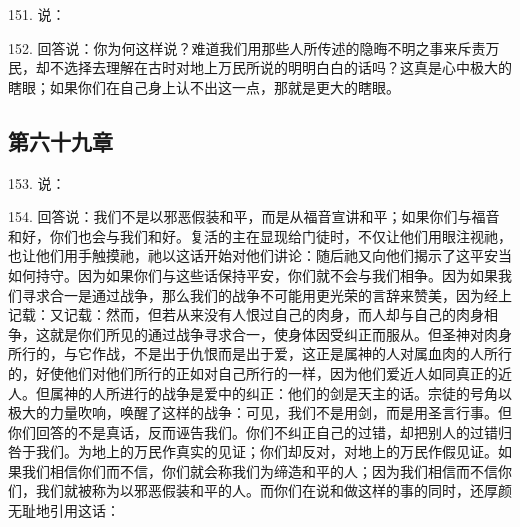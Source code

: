 151. 说：\par

152. 回答说：你为何这样说？难道我们用那些人所传述的隐晦不明之事来斥责万民，却不选择去理解在古时对地上万民所说的明明白白的话吗？这真是心中极大的瞎眼；如果你们在自己身上认不出这一点，那就是更大的瞎眼。\par


\subsection{第六十九章}

153. 说：\par

154. 回答说：我们不是以邪恶假装和平，而是从福音宣讲和平；如果你们与福音和好，你们也会与我们和好。复活的主在显现给门徒时，不仅让他们用眼注视祂，也让他们用手触摸祂，祂以这话开始对他们讲论：随后祂又向他们揭示了这平安当如何持守。因为如果你们与这些话保持平安，你们就不会与我们相争。因为如果我们寻求合一是通过战争，那么我们的战争不可能用更光荣的言辞来赞美，因为经上记载：又记载：然而，但若从来没有人恨过自己的肉身，而人却与自己的肉身相争，这就是你们所见的通过战争寻求合一，使身体因受纠正而服从。但圣神对肉身所行的，与它作战，不是出于仇恨而是出于爱，这正是属神的人对属血肉的人所行的，好使他们对他们所行的正如对自己所行的一样，因为他们爱近人如同真正的近人。但属神的人所进行的战争是爱中的纠正：他们的剑是天主的话。宗徒的号角以极大的力量吹响，唤醒了这样的战争：可见，我们不是用剑，而是用圣言行事。但你们回答的不是真话，反而诬告我们。你们不纠正自己的过错，却把别人的过错归咎于我们。为地上的万民作真实的见证；你们却反对，对地上的万民作假见证。如果我们相信你们而不信，你们就会称我们为缔造和平的人；因为我们相信而不信你们，我们就被称为以邪恶假装和平的人。而你们在说和做这样的事的同时，还厚颜无耻地引用这话：\par

